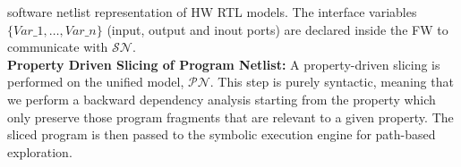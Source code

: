 \documentclass[sigconf]{acmart}
\newcommand{\tool}[1]{\textsc{#1}\xspace}
\newcommand{\verifox}{\tool{CoVeriIf}}
\newcommand{\Omit}[1]{}
\begin{document}
software netlist representation of HW RTL models.
The interface variables $\{Var\_1,\dots,Var\_n\}$ 
(input, output and inout ports) are declared inside the 
FW to communicate with $\mathcal{SN}$. \\ 
\Omit{
$\mathcal{PN}$ is verification equivalent 
to the concurrent execution of FW and $\mathcal{SN}$.
}
\textbf{Property Driven Slicing of Program Netlist:}
A property-driven slicing is performed on the unified model, $\mathcal{PN}$.  
This step is purely syntactic, meaning that we perform a backward dependency 
analysis starting from the property which only preserve those 
program fragments that are relevant to a given property. The sliced program 
is then passed to the symbolic execution engine for path-based exploration. 
\Omit{
\section{Extracting relevant FW/HW interactions using}
Our unified FW-HW model, $\mathcal{PN}$, is composed of a set of 
FW scenarios, $\{\mathcal{S}\}$, and a set of HW transactions, $\{\mathcal{T}\}$ 
that $\{\mathcal{S}\}$ depends on. However, only a subset of $\{\mathcal{T}\}$ is 
relevant for a particular $\mathcal{S}_i \in \mathcal{S}$. In this section, 
we present a path-based exploration algorithm to automatically infer 
interacting $\mathcal{S}/\mathcal{T}$ pairs from $\mathcal{PN}$. 
}
\end{document}
